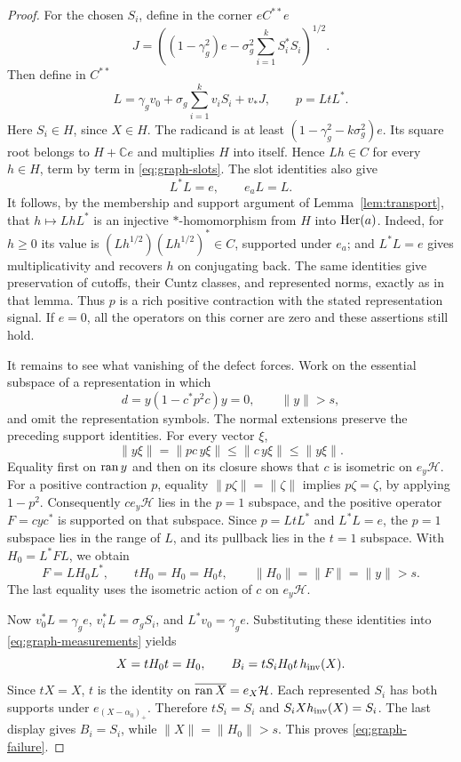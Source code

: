 \begin{proof}
For the chosen \(S_i\), define in the corner \(eC^{**}e\)
\[
 J=\left((1-\gamma_g^2)e
       -\sigma_g^2\sum_{i=1}^kS_i^*S_i\right)^{1/2}.
\]
Then define in \(C^{**}\)
\[
 L=\gamma_g v_0+\sigma_g\sum_{i=1}^k v_iS_i+v_*J,
 \qquad p=LtL^*.
\]
Here \(S_i\in H\), since \(X\in H\).  The radicand is at least
\((1-\gamma_g^2-k\sigma_g^2)e\).  Its square root belongs to
\(H+\mathbb C e\) and multiplies \(H\) into itself.  Hence
\(Lh\in C\) for every \(h\in H\), term by term in
\eqref{eq:graph-slots}.  The slot identities also give
\[
 L^*L=e,\qquad e_aL=L.
\]
It follows, by the membership and support argument of
Lemma~\ref{lem:transport}, that \(h\mapsto LhL^*\) is an
injective \(*\)-homomorphism from \(H\) into \(\operatorname{Her}(a)\).
Indeed, for \(h\ge0\) its value is
\((Lh^{1/2})(Lh^{1/2})^*\in C\), supported under \(e_a\);
and \(L^*L=e\) gives multiplicativity and recovers \(h\) on
conjugating back.  The same identities give preservation of
cutoffs, their Cuntz classes, and represented norms, exactly
as in that lemma.  Thus \(p\) is a rich positive contraction
with the stated representation signal.  If \(e=0\), all the
operators on this corner are zero and these assertions still
hold.

It remains to see what vanishing of the defect forces.  Work
on the essential subspace of a representation in which
\[
 d=y(1-c^*p^2c)y=0,\qquad \|y\|>s,
\]
and omit the representation symbols.  The normal extensions
preserve the preceding support identities.  For every vector
\(\xi\),
\[
 \|y\xi\|=\|pc\,y\xi\|
       \le\|c\,y\xi\|\le\|y\xi\|.
\]
Equality first on \(\operatorname{ran} y\) and then on its closure shows
that \(c\) is isometric on \(e_y\mathcal H\).  For a positive
contraction \(p\), equality \(\|p\zeta\|=\|\zeta\|\) implies
\(p\zeta=\zeta\), by applying \(1-p^2\).  Consequently
\(ce_y\mathcal H\) lies in the \(p=1\) subspace, and the
positive operator \(F=cyc^*\) is supported on that subspace.
Since \(p=LtL^*\) and \(L^*L=e\), the \(p=1\) subspace lies
in the range of \(L\), and its pullback lies in the \(t=1\)
subspace.  With \(H_0=L^*FL\), we obtain
\[
 F=LH_0L^*,\qquad tH_0=H_0=H_0t,\qquad
 \|H_0\|=\|F\|=\|y\|>s.
\]
The last equality uses the isometric action of \(c\) on
\(e_y\mathcal H\).

Now \(v_0^*L=\gamma_g e\), \(v_i^*L=\sigma_g S_i\), and
\(L^*v_0=\gamma_g e\).  Substituting these identities into
\eqref{eq:graph-measurements} yields
\[
 X=tH_0t=H_0,\qquad
 B_i=tS_iH_0t\,h_{\rm inv}(X).
\]
Since \(tX=X\), \(t\) is the identity on
\(\overline{\operatorname{ran} X}=e_X\mathcal H\).  Each represented \(S_i\)
has both supports under \(e_{(X-\alpha_0)_+}\).  Therefore
\(tS_i=S_i\) and \(S_iXh_{\rm inv}(X)=S_i\).  The last display
gives \(B_i=S_i\), while \(\|X\|=\|H_0\|>s\).
This proves \eqref{eq:graph-failure}.
\end{proof}

